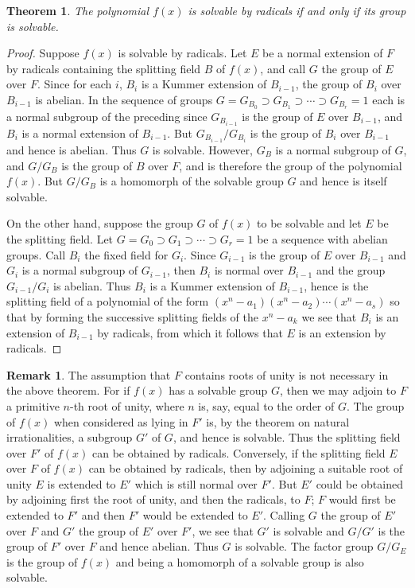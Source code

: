 \documentclass[10pt,leqno,a5paper]{book}
\newtheorem{theo}{Theorem}
\theoremstyle{definition}
\newtheorem*{rema}{Remark}
\begin{document}
\begin{theo}
\label{theo:III.5}
The polynomial $f(x)$ is solvable by radicals if and only if its group is solvable.
\end{theo}


\begin{proof}
Suppose $f(x)$ is solvable by radicals.
Let $E$ be a normal extension of $F$ by radicals containing the splitting field $B$ of $f(x)$, and call $G$ the group of $E$ over $F$.
Since for each $i$, $B_i$ is a Kummer extension of $B_{i-1}$, the group of $B_i$ over $B_{i-1}$ is abelian.
In the sequence of groups $G = G_{B_0} \supset G_{B_1} \supset \cdots \supset G_{B_r} = 1$ each is a normal subgroup of the preceding since $G_{B_{i-1}}$ is the group of $E$ over $B_{i-1}$, and $B_i$ is a normal extension of $B_{i-1}$.
But $G_{B_{i-1}}/G_{B_i}$ is the group of $B_i$ over $B_{i-1}$ and hence is abelian.
Thus $G$ is solvable.
However, $G_B$ is a normal subgroup of $G$, and $G/G_B$ is the group of $B$ over $F$, and is therefore the group of the polynomial $f(x)$.
But $G/G_B$ is a homomorph of the solvable group $G$ and hence is itself solvable.

On the other hand, suppose the group $G$ of $f(x)$ to be solvable and let $E$ be the splitting field.
Let $G = G_0 \supset G_1 \supset \cdots \supset G_r = 1$ be a sequence with abelian groups.
Call $B_i$ the fixed field for $G_i$.
Since $G_{i-1}$ is the group of $E$ over $B_{i-1}$ and $G_i$ is a normal subgroup of $G_{i-1}$, then $B_i$ is normal over $B_{i-1}$ and the group $G_{i-1} / G_i$ is abelian.
Thus $B_i$ is a Kummer extension of $B_{i-1}$, hence is the splitting field of a polynomial of the form $(x^n - a_1) (x^n - a_2) \cdots (x^n - a_s)$ so that by forming the successive splitting fields of the $x^n - a_k$ we see that $B_i$ is an extension of $B_{i-1}$ by radicals, from which it follows that $E$ is an extension by radicals.
\end{proof}


\begin{rema}
The assumption that $F$ contains roots of unity is not necessary in the above theorem.
For if $f(x)$ has a solvable group $G$, then we may adjoin to $F$ a primitive $n$-th root of unity, where $n$ is, say, equal to the order of $G$.
The group of $f(x)$ when considered as lying in $F'$ is, by the theorem on natural irrationalities, a subgroup $G'$ of $G$, and hence is solvable.
Thus the splitting field over $F'$ of $f(x)$ can be obtained by radicals.
Conversely, if the splitting field $E$ over $F$ of $f(x)$ can be obtained by radicals, then by adjoining a suitable root of unity $E$ is extended to $E'$ which is still normal over $F'$.
But $E'$ could be obtained by adjoining first the root of unity, and then the radicals, to $F$; $F$ would first be extended to $F'$ and then $F'$ would be extended to $E'$.
Calling $G$ the group of $E'$ over $F$ and $G'$ the group of $E'$ over $F'$, we see that $G'$ is solvable and $G / G'$ is the group of $F'$ over $F$ and hence abelian.
Thus $G$ is solvable.
The factor group $G / G_E$ is the group of $f(x)$ and being a homomorph of a solvable group is also solvable.
\end{rema}
\end{document}
